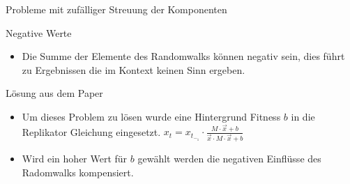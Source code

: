 \documentclass{beamer}
\begin{document}
\begin{frame}{Probleme mit zufälliger Streuung der Komponenten}
    \begin{alertblock}{Negative Werte}
    \begin{itemize}
        \item Die Summe der Elemente des Randomwalks können negativ sein, dies führt zu Ergebnissen die im Kontext keinen Sinn ergeben.
    \end{itemize}
    \end{alertblock} \pause
    
     \begin{block}{Lösung aus dem Paper}
    \begin{itemize}
        \item Um dieses Problem zu lösen wurde eine Hintergrund Fitness $b$ in die Replikator Gleichung eingesetzt. 
        $x_t = x_t_-_1 \cdot \frac{M \cdot \vec{x}{} +b}{\vec{x}{} \cdot M \cdot \vec{x}{} +b}$
        \item Wird ein hoher Wert für $b$ gewählt werden die negativen Einflüsse des Radomwalks kompensiert.
    \end{itemize}
    \end{block} 
\end{frame}

\end{document}
